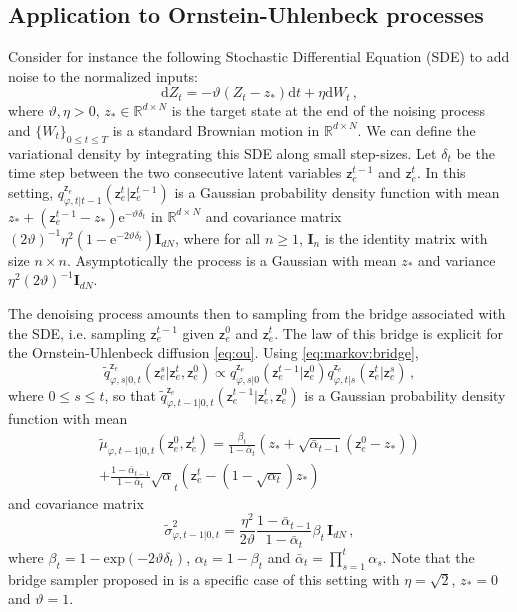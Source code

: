 \documentclass[nolayout]{article}
\theoremstyle{plain}
\theoremstyle{definition}
\theoremstyle{remark}
\newcommand{\latentcont}{\mathsf{z}_e}
\newcommand{\bckw}{\tilde{q}}
\begin{document}
\subsection{Application to Ornstein-Uhlenbeck processes}
\label{sec:OU}
Consider for instance the following Stochastic Differential Equation (SDE) to add noise to the  normalized inputs:
\begin{equation}
\label{eq:ou}
\mathrm{d}Z_t = -\vartheta (Z_t - z_*)\mathrm{d}t + \eta\mathrm{d}W_t\,,
\end{equation}
where $\vartheta, \eta>0$,  $z_*\in\mathbb{R}^{d\times N}$ is the target state at the end of the noising process and $\{W_t\}_{0\leqslant t\leqslant T}$ is a standard Brownian motion in $\mathbb{R}^{d\times N}$. We can define the variational density by integrating this SDE along small step-sizes. Let $\delta_t$ be the time step between the two consecutive latent variables $\latentcont^{t-1}$ and $\latentcont^{t}$. In this setting, $q^{\latentcont}_{\varphi,t|t-1}(\latentcont^t|\latentcont^{t-1})$ is a Gaussian probability density function with mean $z_* + (\latentcont^{t-1}-z_*)\mathrm{e}^{-\vartheta \delta_t}$ in $\mathbb{R}^{d\times N}$ and covariance matrix $(2\vartheta)^{-1}\eta^2(1-\mathrm{e}^{-2\vartheta\delta_t})\mathbf{I}_{dN}$, where for all $n\geqslant 1$, $\mathbf{I}_{n}$ is the identity matrix with size $n\times n$. Asymptotically the process is a Gaussian with mean $z_*$ and variance $\eta^2(2\vartheta)^{-1} \mathbf{I}_{dN}$.

The denoising process amounts then to sampling from the bridge associated with the SDE, i.e. sampling $\latentcont^{t-1}$ given $\latentcont^0$ and $\latentcont^t$. The law of this bridge is explicit for the Ornstein-Uhlenbeck diffusion \eqref{eq:ou}.
Using \eqref{eq:markov:bridge},
$$
\bckw^{\latentcont}_{\varphi,s|0,t}(\latentcont^{s}|\latentcont^{t},\latentcont^{0}) \propto q^{\latentcont}_{\varphi,s|0}(\latentcont^{t-1}|\latentcont^{0}) q^{\latentcont}_{\varphi,t|s}(\latentcont^{t}|\latentcont^{s})\,,
$$
where $0\leqslant s\leqslant t$, so that $\bckw^{\latentcont}_{\varphi,t-1|0,t}(\latentcont^{t-1}|\latentcont^{t},\latentcont^{0})$ is a Gaussian probability density function with mean
\begin{multline*}
 \tilde \mu_{\varphi,t-1|0,t}(\latentcont^0,\latentcont^t) = \frac{\beta_t}{1-\bar{\alpha}_t}\left(z_* + \sqrt{\bar{\alpha}_{t-1}}(\latentcont^0-z_*)\right)\\  + \frac{1-\bar{\alpha}_{t-1}}{1-\bar{\alpha}_t}\sqrt{\alpha}_t\left(\latentcont^t - (1 - \sqrt{\alpha_t} )z_*\right)
 \end{multline*}
 and covariance matrix
 $$
 \tilde \sigma^2_{\varphi,t-1|0,t} = \frac{\eta^2}{2\vartheta}\frac{1- \bar \alpha_{t-1}}{1- \bar \alpha_{t}}\beta_t\, \mathbf{I}_{dN}\,,
 $$
 where $\beta_t = 1 - \mathrm{exp}(-2\vartheta \delta_t)$, $\alpha_t = 1-\beta_t$ and $\bar{\alpha}_t = \prod_{s=1}^{t}\alpha_s$.
 Note that the bridge sampler proposed in \cite{ho2020denoising} is a specific case of this setting with $\eta = \sqrt{2}$, $z_*=0$ and $\vartheta = 1$. 
\end{document}
